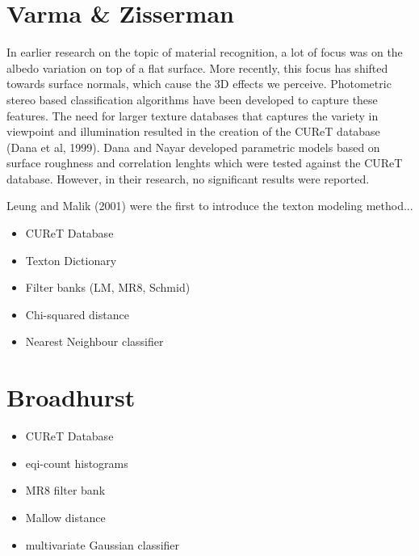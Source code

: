 \hypertarget{RelatedWork}{
\section{Varma \& Zisserman}\label{VarmaZisserman}
}

In earlier research on the topic of material recognition, a lot of focus was on the albedo variation on top of a flat surface. More recently, this focus has shifted towards surface normals, which cause the 3D effects we perceive. Photometric stereo based classification algorithms have been developed to capture these features.
The need for larger texture databases that captures the variety in viewpoint and illumination resulted in the creation of the CUReT database (Dana et al, 1999). Dana and Nayar developed parametric models based on surface roughness and correlation lenghts which were tested against the CUReT database. However, in their research, no significant results were reported.

Leung and Malik (2001) were the first to introduce the texton modeling method...

\begin{itemize}
	\item{CUReT Database}
	\item{Texton Dictionary}
	\item{Filter banks (LM, MR8, Schmid)}
	\item{Chi-squared distance}
	\item{Nearest Neighbour classifier}
\end{itemize}

\section{Broadhurst}\label{Broadhurst}
\begin{itemize}
	\item{CUReT Database}
	\item{eqi-count histograms}
	\item{MR8 filter bank}
	\item{Mallow distance}
	\item{multivariate Gaussian classifier}
\end{itemize}


